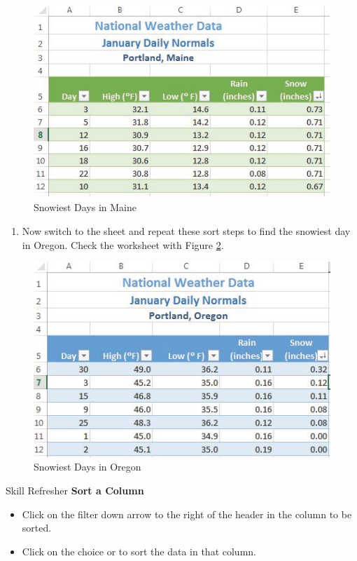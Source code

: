 \begin{figure}[H]
	\centering
	\includegraphics[width=\maxwidth{.95\linewidth}]{gfx/ch05_fig09}
	\caption{Snowiest Days in Maine}
	\label{05:fig09}
\end{figure}

\begin{enumerate}
	\item Now switch to the  sheet and repeat these sort steps to find the snowiest day in Oregon. Check the worksheet with Figure \ref{05:fig10}.
\end{enumerate}

\begin{figure}[H]
	\centering
	\includegraphics[width=\maxwidth{.95\linewidth}]{gfx/ch05_fig10}
	\caption{Snowiest Days in Oregon}
	\label{05:fig10}
\end{figure}

\begin{center}
	\begin{sklbox}{Skill Refresher}
		\textbf{Sort a Column}
		\\
		\begin{itemize}
			\setlength{\itemsep}{0pt}
			\setlength{\parskip}{0pt}
			\setlength{\parsep}{0pt}

			\item Click on the filter down arrow to the right of the header in the column to be sorted.
			\item Click on the choice  or  to sort the data in that column.
						
		\end{itemize}
	\end{sklbox}
\end{center}

